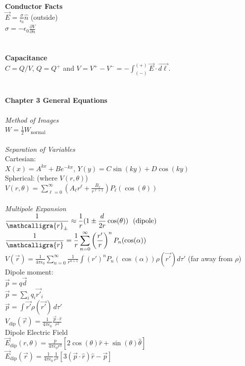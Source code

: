 \documentclass[12pt]{article}
\newcommand{\ds}{\displaystyle}
\newcommand{\scripty}[1]{\ensuremath{\mathcalligra{#1}}}
\begin{document}
\begin{flushleft}
\textbf{Conductor Facts }\\
$\vec{E}=\frac{\sigma}{\epsilon_0}\hat{n}$ (outside)\\
$\sigma=-\epsilon_0\frac{\partial V}{\partial n}$\\~\\~\\

\textbf{Capacitance}\\
$C=Q/V$, $Q=Q^+$ and $V=V^+-V^-=-\int_{(-)}^{(+)}\vec{E}\cdot\vec{d\ell}$.\\~\\~\\

\textbf{Chapter 3 General Equations}\\~\\

\textit{Method of Images}\\
$\ds W=\frac{1}{2}W_{\text{normal}}$\\~\\

\textit{Separation of Variables}\\
Cartesian:\\
$\ds X(x)=A^{kx}+Be^{-kx}$, $\ds Y(y)=C\sin(ky)+D\cos(ky)$\\
Spherical: (where $V(r,\theta)$)\\
$\ds V(r,\theta)=\sum_{\ell=0}^\infty\left(A_\ell r^\ell+\frac{B_\ell}{r^{\ell+1}}\right)P_\ell(\cos(\theta))$\\~\\

\textit{Multipole Expansion}\\
$\ds \frac{1}{\scripty{r}_\pm}\approx\frac{1}{r}(1\pm\frac{d}{2r}\cos(\theta))\ \ (\text{dipole})$\\
$\ds \frac{1}{\scripty{r}}=\frac{1}{r}\sum_{n=0}^\infty\left(\frac{r'}{r}\right)^nP_n(\cos(\alpha))$\\
$\ds V(\vec{r})=\frac{1}{4\pi\epsilon_0}\sum_{n=0}^\infty\frac{1}{r^{n+1}}\int(r')^nP_n(\cos(\alpha))\rho(\vec{r'})d\tau'$ (far away from $\rho$)\\
Dipole moment:\\
$\ds \vec{p}=q\vec{d}$\\
$\ds \vec{p}=\sum_iq_i\vec{r'}_i$\\
$\ds \vec{p}=\int\vec{r'}\rho(\vec{r'})\,d\tau'$\\
$\ds V_{\text{dip}}(\vec{r})=\frac{1}{4\pi\epsilon_0}\frac{\vec{p}\cdot\hat{r}}{r^2}$\\
Dipole Electric Field\\
$\ds \vec{E}_{\text{dip}}(r,\theta)=\frac{p}{4\pi\epsilon_0r^3}[2\cos(\theta)\hat{r}+\sin(\theta)\hat{\theta}]$\\
$\ds \vec{E}_{\text{dip}}(\vec{r})=\frac{1}{4\pi\epsilon_0}\frac{1}{r^3}[3(\vec{p}\cdot\hat{r})\hat{r}-\vec{p}]$\\~\\



\end{flushleft}
\end{document}
